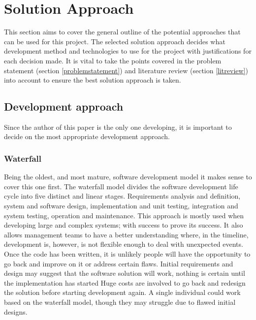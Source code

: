 \section{Solution Approach}
This section aims to cover the general outline of the potential approaches that can be used for this project.
The selected solution approach decides what development method and technologies to use for the project with justifications
for each decision made.
It is vital to take the points covered in the problem statement (section \ref{problemstatement}) and literature 
review (section \ref{litreview}) into account to ensure the best solution approach is taken.

\subsection{Development approach}
Since the author of this paper is the only one developing, it is important to decide on the most appropriate development approach.

\subsubsection*{Waterfall}
Being the oldest, and most mature, software development model it makes sense to cover this one first.
The waterfall model divides the software development life cycle into five distinct and linear stages.
Requirements analysis and definition, system and software design, implementation and unit testing, integration and system testing,
operation and maintenance.
This approach is mostly used when developing large and complex systems; with success to prove its success.
It also allows management teams to have a better understanding where, in the timeline, development is, however, is not flexible enough
to deal with unexpected events.
Once the code has been written, it is unlikely people will have the opportunity to go back and improve on it or address certain flaws.
Initial requirements and design may suggest that the software solution will work, nothing is certain until the implementation has started
Huge costs are involved to go back and redesign the solution before starting development again. 
A single individual could work based on the waterfall model, though they may struggle due to flawed initial designs.

